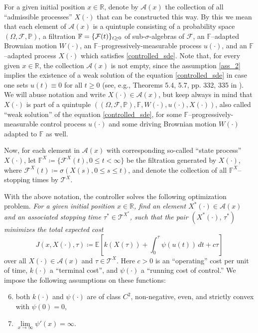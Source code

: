 \documentclass[11pt,tbtags,reqno]{article}
\theoremstyle{definition}
\numberwithin{equation}{section}
\theoremstyle{definition}
\newcommand{\pr}{\mathbb{P}}
\begin{document}
For a given initial position $x \in \mathbb{R}$, denote by $\mathcal{A}(x)$ the collection of all ``admissible processes'' $X(\cdot)$ that can be constructed this way. By this we mean that each element of $\mathcal{A}(x)$ is a quintuple consisting of a probability space $(\Omega, \mathcal{F}, \pr)$, a filtration $\mathbb{F} =\nobreak \{\mathcal{F}(t)\}_{t \ge 0}$ of sub-$\sigma$-algebras of $\mathcal{F}$, an $\mathbb{F}$--adapted Brownian motion $W(\cdot)$, an $\mathbb{F}$--progressively-measurable process $u(\cdot)$, and an $\mathbb{F}$--adapted process $X(\cdot)$ which satisfies \eqref{controlled_sde}. Note that, for every given $x \in \mathbb{R}$, the collection $\mathcal{A}(x)$ is not empty, since the assumption \ref{ass_2} implies the existence of a weak solution of the equation \eqref{controlled_sde} in case one sets $u(t) \equiv 0$ for all $t \ge 0$ (see, e.g., Theorems 5.4, 5.7, pp. 332, 335 in \cite{BMSC}). We will abuse notation and write $X(\cdot) \in \mathcal{A}(x)$, but keep always in mind that $X(\cdot)$ is part of a quintuple $\left((\Omega, \mathcal{F}, \pr), \mathbb{F}, W(\cdot), u(\cdot), X(\cdot) \right)$, also called ``weak solution'' of the equation \eqref{controlled_sde}, for some $\mathbb{F}$--progressively-measurable control process $u(\cdot)$ and some driving Brownian motion $W(\cdot)$ adapted to $\mathbb{F}$ as well. 

Now, for each element in $\mathcal{A}(x)$ with corresponding so-called ``state process'' $X(\cdot)$, let $\mathbb{F}^X \coloneqq \{\mathcal{F}^X(t), 0 \le t < \infty \}$ be the filtration generated by $X(\cdot)$, where $\mathcal{F}^X(t) \coloneqq \sigma(X(s), 0 \leq s \le t)$, and denote the collection of all $\mathbb{F}^X$--stopping times by $\mathcal{T}^X$.


With the above notation, the controller solves the following optimization problem. \textit{For a given initial position $x \in \mathbb{R}$, find an element $X^*(\cdot) \in \mathcal{A}(x)$ and an associated  stopping time $\tau^* \in \mathcal{T}^{X^*}$, such that the pair $(X^*(\cdot), \, \tau^*)$ minimizes the total expected cost}
\begin{equation}\label{total_cost}
    J(x, X(\cdot), \tau) \coloneqq \mathbb{E}\left[k(X(\tau))+\int_{0}^{\tau} \psi(u(t)) \, dt + c \tau\right]
\end{equation}
over all $X(\cdot) \in \mathcal{A}(x)$ and $\tau \in \mathcal{T}^X$. 
Here $c > 0$ is an ``operating'' cost per unit of time, $k(\cdot)$ a ``terminal cost'', and $\psi(\cdot)$ a “running cost of control.” We impose the following assumptions on these functions:
\begin{enumerate}[label = \textbf{(A\arabic*)}]
\setcounter{enumi}{5}
    \item both $k(\cdot)$ and $\psi(\cdot)$ are of class $C^2$, non-negative, even, and strictly convex with $\psi(0) = 0$, \label{ass_5}
    \item $\lim\limits_{x \to \infty} \psi'(x) = \infty$. \label{ass_6}
\end{enumerate}
\end{document}
